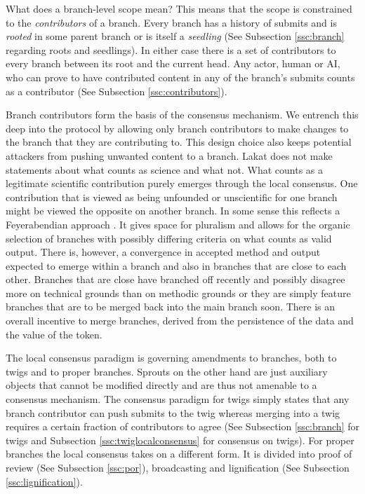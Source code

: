 What does a branch-level scope mean? This means that the scope is constrained to the \textit{contributors} of a branch. Every branch has a history of submits and is \textit{rooted} in some parent branch or is itself a \textit{seedling} (See Subsection \ref{ssc:branch} regarding roots and seedlings). In either case there is a set of contributors to every branch between its root and the current head. Any actor, human or AI, who can prove to have contributed content in any of the branch's submits counts as a contributor (See Subsection \ref{ssc:contributors}). 

Branch contributors form the basis of the consensus mechanism. We entrench this deep into the protocol by allowing only branch contributors to make changes to the branch that they are contributing to. This design choice also keeps potential attackers from pushing unwanted content to a branch. Lakat does not make statements about what counts as science and what not. What counts as a legitimate scientific contribution purely emerges through the local consensus. One contribution that is viewed as being unfounded or unscientific for one branch might be viewed the opposite on another branch. In some sense this reflects a Feyerabendian approach \cite{feyerabend1975against}. It gives space for pluralism and allows for the organic selection of branches with possibly differing criteria on what counts as valid output. There is, however, a convergence in accepted method and output expected to emerge within a branch and also in branches that are close to each other. Branches that are close have branched off recently and possibly disagree more on technical grounds than on methodic grounds or they are simply feature branches that are to be merged back into the main branch soon. There is an overall incentive to merge branches, derived from the persistence of the data and the value of the token. 

The local consensus paradigm is governing amendments to branches, both to twigs and to proper branches. Sprouts on the other hand are just auxiliary objects that cannot be modified directly and are thus not amenable to a consensus mechanism. The consensus paradigm for twigs simply states that any branch contributor can push submits to the twig whereas merging into a twig requires a certain fraction of contributors to agree (See Subsection \ref{ssc:branch} for twigs and Subsection \ref{ssc:twiglocalconsensus} for consensus on twigs). For proper branches the local consensus takes on a different form. It is divided into proof of review (See Subsection \ref{ssc:por}), broadcasting and lignification (See Subsection \ref{ssc:lignification}).

